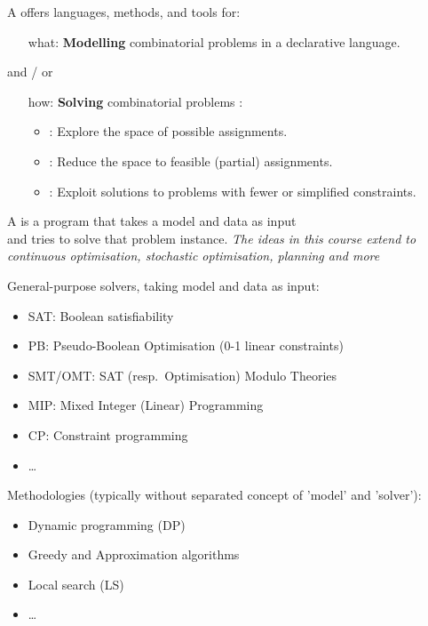 \documentclass{cons-beamer}
\begin{document}
\begin{frame}
  A  offers languages, methods, and tools for: \vfill
  \begin{itemize}
    \item[what:] \textbf{Modelling} combinatorial problems in a \alert{declarative} language.
  \end{itemize}\vfill
  and / or \vfill
  \begin{itemize}
    \item[how:] \textbf{Solving} combinatorial problems : \vfill
    \begin{itemize}
      \item {}: Explore the space of possible assignments. \vfill
      \item {}: Reduce the space to feasible (partial) assignments. \vfill
      \item {}: Exploit solutions to problems with fewer or simplified constraints. \vfill
    \end{itemize}
  \end{itemize}
  A  is a program that takes a model and data as input \\
  and tries to solve that problem instance.\vfill
  \textit{The ideas in this course extend to continuous optimisation, stochastic optimisation, planning and more}
\end{frame}

\begin{frame}
  \begin{examples}
    General-purpose solvers, taking model and data as input:
    \begin{itemize}
    \item SAT: Boolean satisfiability
    \item PB: Pseudo-Boolean Optimisation (0-1 linear constraints)
    \item SMT/OMT: SAT (resp.\ Optimisation) Modulo Theories
    \item MIP: Mixed Integer (Linear) Programming
    \item CP: Constraint programming
    \item \dots
    \end{itemize}
  \end{examples}
  \begin{examples}
    Methodologies (typically without separated concept of 'model' and 'solver'):
    \begin{itemize}
    \item Dynamic programming (DP)
    \item Greedy and Approximation algorithms
    \item Local search (LS)
    \item \dots
    \end{itemize}
  \end{examples}
\end{frame}
\end{document}
